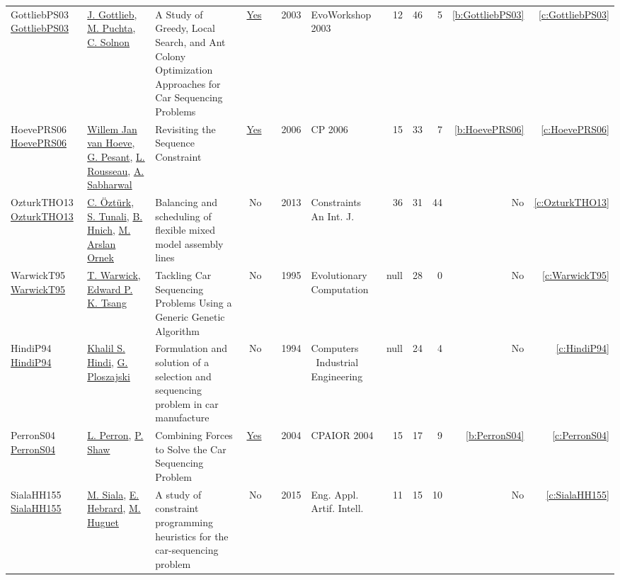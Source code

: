 {\begin{longtable}{>{\raggedright\arraybackslash}p{3cm}>{\raggedright\arraybackslash}p{6cm}>{\raggedright\arraybackslash}p{6.5cm}rrrp{2.5cm}rrrrr}
GottliebPS03 \href{https://doi.org/10.1007/3-540-36605-9_23}{GottliebPS03} & \hyperref[auth:a9]{J. Gottlieb}, \hyperref[auth:a10]{M. Puchta}, \hyperref[auth:a5]{C. Solnon} & A Study of Greedy, Local Search, and Ant Colony Optimization Approaches for Car Sequencing Problems & \href{../cars/works/GottliebPS03.pdf}{Yes} & \cite{GottliebPS03} & 2003 & EvoWorkshop 2003 & 12 & 46 & 5 & \ref{b:GottliebPS03} & \ref{c:GottliebPS03}\\
HoevePRS06 \href{https://doi.org/10.1007/11889205_44}{HoevePRS06} & \hyperref[auth:a43]{Willem Jan van Hoeve}, \hyperref[auth:a40]{G. Pesant}, \hyperref[auth:a44]{L. Rousseau}, \hyperref[auth:a42]{A. Sabharwal} & Revisiting the Sequence Constraint & \href{../cars/works/HoevePRS06.pdf}{Yes} & \cite{HoevePRS06} & 2006 & CP 2006 & 15 & 33 & 7 & \ref{b:HoevePRS06} & \ref{c:HoevePRS06}\\
OzturkTHO13 \href{https://doi.org/10.1007/s10601-013-9142-6}{OzturkTHO13} & \hyperref[auth:a14]{C. {\"{O}}zt{\"{u}}rk}, \hyperref[auth:a15]{S. Tunali}, \hyperref[auth:a16]{B. Hnich}, \hyperref[auth:a17]{M. Arslan Ornek} & Balancing and scheduling of flexible mixed model assembly lines & No & \cite{OzturkTHO13} & 2013 & Constraints An Int. J. & 36 & 31 & 44 & No & \ref{c:OzturkTHO13}\\
WarwickT95 \href{http://dx.doi.org/10.1162/evco.1995.3.3.267}{WarwickT95} & \hyperref[auth:a45]{T. Warwick}, \hyperref[auth:a46]{Edward P. K. Tsang} & Tackling Car Sequencing Problems Using a Generic Genetic Algorithm & No & \cite{WarwickT95} & 1995 & Evolutionary Computation & null & 28 & 0 & No & \ref{c:WarwickT95}\\
HindiP94 \href{http://dx.doi.org/10.1016/0360-8352(94)90038-8}{HindiP94} & \hyperref[auth:a37]{Khalil S. Hindi}, \hyperref[auth:a38]{G. Ploszajski} & Formulation and solution of a selection and sequencing problem in car manufacture & No & \cite{HindiP94} & 1994 & Computers \  Industrial Engineering & null & 24 & 4 & No & \ref{c:HindiP94}\\
PerronS04 \href{https://doi.org/10.1007/978-3-540-24664-0_16}{PerronS04} & \hyperref[auth:a20]{L. Perron}, \hyperref[auth:a21]{P. Shaw} & Combining Forces to Solve the Car Sequencing Problem & \href{../cars/works/PerronS04.pdf}{Yes} & \cite{PerronS04} & 2004 & CPAIOR 2004 & 15 & 17 & 9 & \ref{b:PerronS04} & \ref{c:PerronS04}\\
SialaHH155 \href{https://doi.org/10.1016/j.engappai.2014.10.009}{SialaHH155} & \hyperref[auth:a11]{M. Siala}, \hyperref[auth:a12]{E. Hebrard}, \hyperref[auth:a13]{M. Huguet} & A study of constraint programming heuristics for the car-sequencing problem & No & \cite{SialaHH155} & 2015 & Eng. Appl. Artif. Intell. & 11 & 15 & 10 & No & \ref{c:SialaHH155}\\

\end{longtable}}
